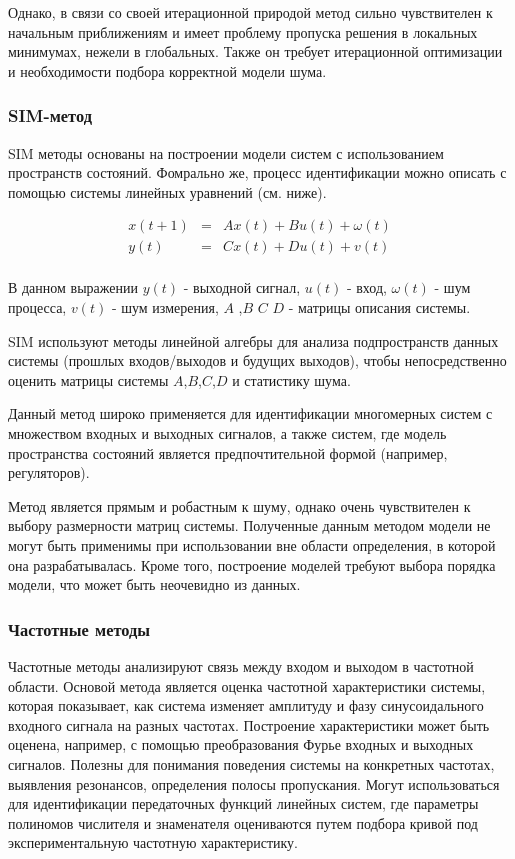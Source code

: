 Однако, в связи со своей итерационной природой метод сильно чувствителен к
начальным приближениям и имеет проблему пропуска решения в локальных минимумах,
нежели в глобальных. Также он требует итерационной оптимизации и необходимости
подбора корректной модели шума.

\subsubsection{SIM-метод}

SIM методы основаны на построении модели систем с использованием пространств состояний. Фомрально же, процесс идентификации можно описать с помощью системы линейных уравнений (см. ниже). 

\begin{equation}
  \begin{array}{rcl}
    x(t+1) & = &Ax(t)+Bu(t)+\omega(t) \\
    y(t) &= & Cx(t)+Du(t)+v(t) \\
  \end{array}
    \label{eq:sim_ss}
\end{equation}

В данном выражении $ y(t) $ - выходной сигнал,  $u(t)$ - вход, $\omega(t)$ -
шум процесса, $v(t)$ - шум измерения, $A$ ,$B$ $C$ $D$ - матрицы описания
системы.

SIM используют методы линейной алгебры для анализа подпространств данных
системы (прошлых входов/выходов и будущих выходов),
чтобы непосредственно оценить матрицы системы $A$,$B$,$C$,$D$ и статистику шума.

Данный метод широко применяется для идентификации многомерных систем с
множеством входных и выходных сигналов, а также систем, где модель пространства
состояний является предпочтительной формой (например, регуляторов).

Метод является прямым и робастным к шуму, однако очень чувствителен к выбору
размерности матриц системы. Полученные данным методом модели не могут быть
применимы при использовании вне области определения, в которой она
разрабатывалась. Кроме того, построение моделей требуют выбора порядка модели,
что может быть неочевидно из данных.

\subsubsection{Частотные методы}

Частотные методы анализируют связь между входом и выходом в частотной области. Основой метода является оценка частотной характеристики системы, которая показывает, как система изменяет амплитуду и фазу синусоидального входного сигнала на разных частотах. Построение характеристики может быть оценена, например, с помощью преобразования Фурье входных и выходных сигналов.
Полезны для понимания поведения системы на конкретных частотах, выявления резонансов, определения полосы пропускания. Могут использоваться для идентификации передаточных функций линейных систем, где параметры полиномов числителя и знаменателя оцениваются путем подбора кривой под экспериментальную частотную характеристику.


